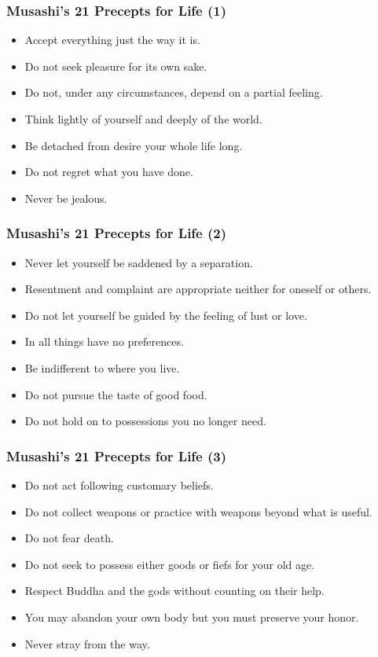 \begin{frame}[fragile]\frametitle{Musashi’s 21 Precepts for Life (1)}

	\begin{itemize}
	\item Accept everything just the way it is.
	\item Do not seek pleasure for its own sake.
	\item Do not, under any circumstances, depend on a partial feeling.
	\item Think lightly of yourself and deeply of the world.
	\item Be detached from desire your whole life long.
	\item Do not regret what you have done.
	\item Never be jealous.
	\end{itemize}

\end{frame}

\begin{frame}[fragile]\frametitle{Musashi’s 21 Precepts for Life (2)}

	\begin{itemize}
	\item Never let yourself be saddened by a separation.
	\item Resentment and complaint are appropriate neither for oneself or others.
	\item Do not let yourself be guided by the feeling of lust or love.
	\item In all things have no preferences.
	\item Be indifferent to where you live.
	\item Do not pursue the taste of good food.
	\item Do not hold on to possessions you no longer need.
	\end{itemize}

\end{frame}

\begin{frame}[fragile]\frametitle{Musashi’s 21 Precepts for Life (3)}

	\begin{itemize}
	\item Do not act following customary beliefs.
	\item Do not collect weapons or practice with weapons beyond what is useful.
	\item Do not fear death.
	\item Do not seek to possess either goods or fiefs for your old age.
	\item Respect Buddha and the gods without counting on their help.
	\item You may abandon your own body but you must preserve your honor.
	\item Never stray from the way.
	\end{itemize}

\end{frame}



